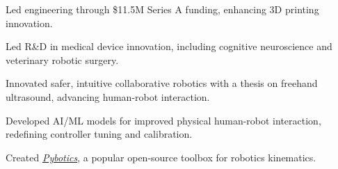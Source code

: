 \documentclass[11pt, letterpaper]{awesome-cv}
\begin{document}
\begin{cventries}
    {
        \begin{cvitems}
            \item{Led engineering through \$11.5M Series A funding, enhancing 3D printing innovation.}
        \end{cvitems}
    }

    {
        \begin{cvitems}
            \item{Led R\&D in medical device innovation, including cognitive neuroscience and veterinary robotic surgery.}
        \end{cvitems}
    }
\end{cventries}

\begin{cventries}
    {
        \begin{cvitems}
            \item{Innovated safer, intuitive collaborative robotics with a thesis on freehand ultrasound, advancing human-robot interaction.}
            \item{Developed AI/ML models for improved physical human-robot interaction, redefining controller tuning and calibration.}
            \item{Created \href{https://github.com/EngNadeau/pybotics}{\textit{Pybotics}}, a popular open-source toolbox for robotics kinematics.}
        \end{cvitems}
    }

    {
        \begin{cvitems}
        \end{cvitems}
    }
\end{cventries}

\newpage
\end{document}
